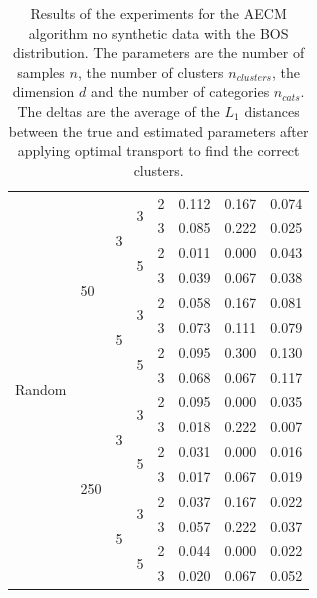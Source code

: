 \documentclass[a4paper,12pt]{article}
\begin{document}
\begin{table}[H]
\begin{minipage}{.48\columnwidth}
\begin{adjustbox}{width=\columnwidth}
\begin{tabular}{lllllrrr}
\cline{1-8} \cline{2-8} \cline{3-8} \cline{4-8}
\multirow[t]{16}{*}{Random} & \multirow[t]{8}{*}{50} & \multirow[t]{4}{*}{3} & \multirow[t]{2}{*}{3} & 2 & 0.112 & 0.167 & 0.074 \\
 &  &  &  & 3 & 0.085 & 0.222 & 0.025 \\
\cline{4-8}
 &  &  & \multirow[t]{2}{*}{5} & 2 & 0.011 & 0.000 & 0.043 \\
 &  &  &  & 3 & 0.039 & 0.067 & 0.038 \\
\cline{3-8} \cline{4-8}
 &  & \multirow[t]{4}{*}{5} & \multirow[t]{2}{*}{3} & 2 & 0.058 & 0.167 & 0.081 \\
 &  &  &  & 3 & 0.073 & 0.111 & 0.079 \\
\cline{4-8}
 &  &  & \multirow[t]{2}{*}{5} & 2 & 0.095 & 0.300 & 0.130 \\
 &  &  &  & 3 & 0.068 & 0.067 & 0.117 \\
\cline{2-8} \cline{3-8} \cline{4-8}
 & \multirow[t]{8}{*}{250} & \multirow[t]{4}{*}{3} & \multirow[t]{2}{*}{3} & 2 & 0.095 & 0.000 & 0.035 \\
 &  &  &  & 3 & 0.018 & 0.222 & 0.007 \\
\cline{4-8}
 &  &  & \multirow[t]{2}{*}{5} & 2 & 0.031 & 0.000 & 0.016 \\
 &  &  &  & 3 & 0.017 & 0.067 & 0.019 \\
\cline{3-8} \cline{4-8}
 &  & \multirow[t]{4}{*}{5} & \multirow[t]{2}{*}{3} & 2 & 0.037 & 0.167 & 0.022 \\
 &  &  &  & 3 & 0.057 & 0.222 & 0.037 \\
\cline{4-8}
 &  &  & \multirow[t]{2}{*}{5} & 2 & 0.044 & 0.000 & 0.022 \\
 &  &  &  & 3 & 0.020 & 0.067 & 0.052 \\
\cline{1-8} \cline{2-8} \cline{3-8} \cline{4-8}
\bottomrule
\end{tabular}
\end{adjustbox}
\caption{Results of the experiments for the AECM algorithm no synthetic data with the BOS distribution. The parameters are the number of samples $n$, the number of clusters $n_{clusters}$, the dimension $d$ and the number of categories $n_{cats}$. The deltas are the average of the $L_1$ distances between the true and estimated parameters after applying optimal transport to find the correct clusters.}
\label{tab:results_bos}
\end{minipage} \hspace{.02\columnwidth}%
\begin{minipage}{.48\columnwidth}
\centering

\end{minipage}
\end{table}
\end{document}
